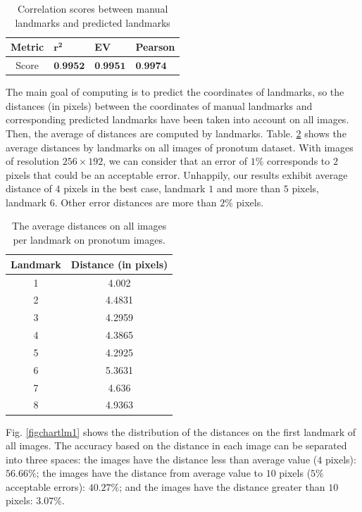 \documentclass[review]{elsarticle}
\begin{document}
\begin{table}[htbp]
	\centering
	\begin{tabular}{|c|p{2cm}|p{2cm}|p{2cm}|}
		Metric & $\mathbf{r^{2}}$ & \textbf{EV} & \textbf{Pearson} \\ \hline
		Score & $\textbf{0.9952}$ & $\textbf{0.9951}$ & $\textbf{0.9974}$ 
	\end{tabular}
	\caption{Correlation scores between manual landmarks and predicted landmarks}
	\label{tblcorrelation}
\end{table}

The main goal of computing is to predict the coordinates of landmarks, so the distances (in pixels) between the coordinates of manual landmarks and corresponding predicted landmarks have been taken into account on all images. Then, the average of distances are computed by landmarks. Table. \ref{tblavgpronotum} shows the average distances by landmarks on all images of pronotum dataset. With images of resolution $256 \times 192$, we can
consider that an error of $1\%$ corresponds to $2$ pixels that could
be an acceptable error. Unhappily, our results exhibit average
distance of $4$ pixels in the best case, landmark $1$ and more than
$5$ pixels, landmark $6$. Other error distances are more than $2\%$
pixels.

\begin{table}[htbp]
	\centering	
	\begin{tabular}{|c|c|}
		\hline
		\textbf{Landmark} & \textbf{Distance} (in pixels) \\ \hline
		1 & 4.002  \\ \hline
		2 & 4.4831 \\ \hline
		3 & 4.2959 \\ \hline
		4 & 4.3865 \\ \hline
		5 & 4.2925 \\ \hline
		6 & 5.3631 \\ \hline
		7 & 4.636 \\ \hline
		8 & 4.9363 \\ \hline
	\end{tabular}
	\caption{The average distances on all images per landmark on pronotum images.}
	\label{tblavgpronotum}
\end{table}

Fig. \ref{figchartlm1} shows the distribution of the distances on the first landmark of all images. The accuracy based on the distance in each image can be
separated into three spaces: the images have the distance less
than average value ($4$ pixels): $56.66\%$; the images have the
distance from average value to $10$ pixels ($5\%$ acceptable errors): $40.27\%$; and the images have the distance
greater than $10$ pixels: $3.07\%$.
\end{document}
